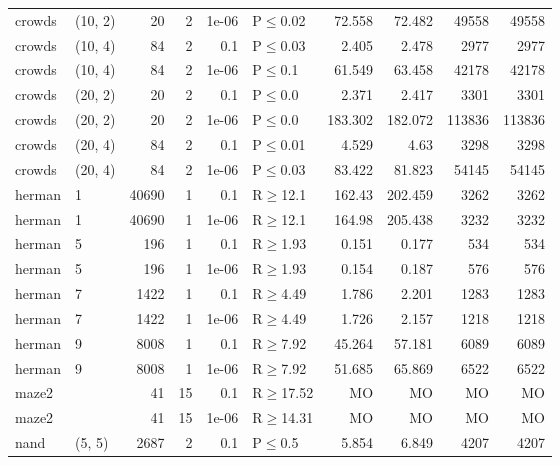 \begin{longtable}{llrrrlrrrr}
 crowds        & (10, 2)   &     	20 &   2 & 1e-06 & P$\leq$0.02  & 72.558   & 72.482  & 49558  & 49558  \\
 crowds        & (10, 4)   &     	84 &   2 & 0.1   & P$\leq$0.03  & 2.405    & 2.478   & 2977   & 2977   \\
 crowds        & (10, 4)   &     	84 &   2 & 1e-06 & P$\leq$0.1   & 61.549   & 63.458  & 42178  & 42178  \\
 crowds        & (20, 2)   &     	20 &   2 & 0.1   & P$\leq$0.0   & 2.371    & 2.417   & 3301   & 3301   \\
 crowds        & (20, 2)   &     	20 &   2 & 1e-06 & P$\leq$0.0   & 183.302  & 182.072 & 113836 & 113836 \\
 crowds        & (20, 4)   &     	84 &   2 & 0.1   & P$\leq$0.01  & 4.529    & 4.63    & 3298   & 3298   \\
 crowds        & (20, 4)   &     	84 &   2 & 1e-06 & P$\leq$0.03  & 83.422   & 81.823  & 54145  & 54145  \\
 herman        & 1         &  	40690 &   1 & 0.1   & R$\geq$12.1  & 162.43   & 202.459 & 3262   & 3262   \\
 herman        & 1         &  	40690 &   1 & 1e-06 & R$\geq$12.1  & 164.98   & 205.438 & 3232   & 3232   \\
 herman        & 5         &    	196 &   1 & 0.1   & R$\geq$1.93  & 0.151    & 0.177   & 534    & 534    \\
 herman        & 5         &    	196 &   1 & 1e-06 & R$\geq$1.93  & 0.154    & 0.187   & 576    & 576    \\
 herman        & 7         &   	1422 &   1 & 0.1   & R$\geq$4.49  & 1.786    & 2.201   & 1283   & 1283   \\
 herman        & 7         &   	1422 &   1 & 1e-06 & R$\geq$4.49  & 1.726    & 2.157   & 1218   & 1218   \\
 herman        & 9         &   	8008 &   1 & 0.1   & R$\geq$7.92  & 45.264   & 57.181  & 6089   & 6089   \\
 herman        & 9         &   	8008 &   1 & 1e-06 & R$\geq$7.92  & 51.685   & 65.869  & 6522   & 6522   \\
 maze2         &           &     	41 &  15 & 0.1   & R$\geq$17.52 & MO       & MO      & MO     & MO     \\
 maze2         &           &     	41 &  15 & 1e-06 & R$\geq$14.31 & MO       & MO      & MO     & MO     \\
 nand          & (5, 5)    &   	2687 &   2 & 0.1   & P$\leq$0.5   & 5.854    & 6.849   & 4207   & 4207   \\

\end{longtable}
